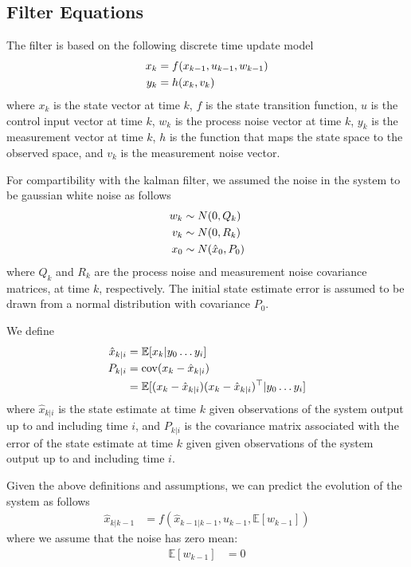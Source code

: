 \documentclass[]{article}
\begin{document}
{\subsection{Filter Equations} %
\label{sub:filter_equations}

The filter is based on the following discrete time update model
\begin{align}
	x_k &= f(x_{k-1}, u_{k-1}, w_{k-1}) \notag \\
	y_k &= h(x_k, v_k)
	\label{eqn:system}
\end{align}
where $x_k$ is the state vector at time $k$, $f$ is the state transition function, $u$ is the control input vector at time $k$, $w_k$ is the process noise vector at time $k$, $y_k$ is the measurement vector at time $k$, $h$ is the function that maps the state space to the observed space, and $v_k$ is the measurement noise vector.

For compartibility with the kalman filter, we assumed the noise in the system to be gaussian white noise as follows
\begin{align}
	w_k &\sim N(0,Q_k) \notag \\
	v_k &\sim N(0,R_k) \notag \\
	x_0 &\sim N(\hat{x}_0,P_0)
	\label{eqn:noisedef}
\end{align}
where $Q_k$ and $R_k$ are the process noise and measurement noise covariance matrices, at time $k$, respectively. The initial state estimate error is assumed to be drawn from a normal distribution with covariance $P_0$.

We define
\begin{align}
	\hat{x}_{k|i} 	&= \mathbb{E}[x_k|y_0 \hdots y_i] \\
	P_{k|i} 		&= \operatorname{cov}(x_k - \hat{x}_{k|i}) \notag \\
					&= \mathbb{E}[ (x_k-\hat{x}_{k|i}) (x_k-\hat{x}_{k|i})^\top | y_0 \hdots y_i]
\end{align}
where $\hat{x}_{k|i}$ is the state estimate at time $k$ given observations of the system output up to and including time $i$, and $P_{k|i}$ is the covariance matrix associated with the error of the state estimate at time $k$ given given observations of the system output up to and including time $i$.

Given the above definitions and assumptions, we can predict the evolution of the system as follows
\begin{align}
	\hat{x}_{k|k-1} &= f(\hat{x}_{k-1|k-1}, u_{k-1}, \mathbb{E}[w_{k-1}])
	\label{eqn:predictx}
\end{align}
where we assume that the noise has zero mean:
\begin{align}
	\mathbb{E}[w_{k-1}] &= 0
\end{align}

}
\end{document}
